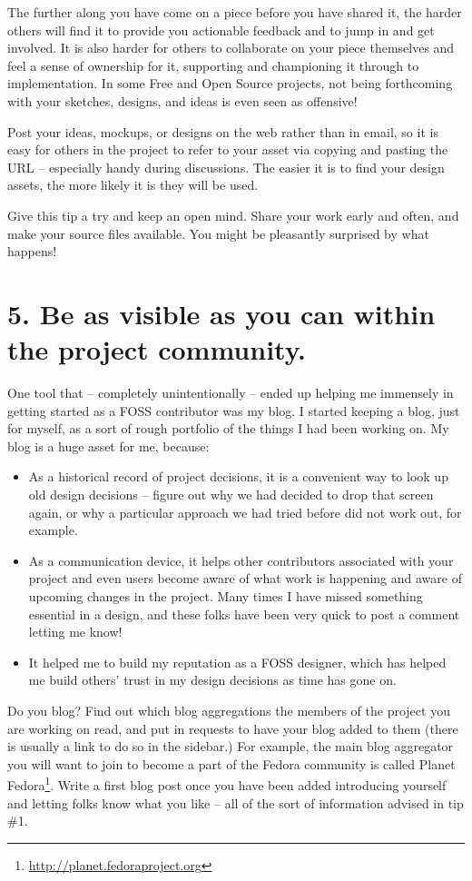The further along you have come on a piece before you have shared it, the harder
others will find it to provide you actionable feedback and to jump in and get
involved. It is also harder for others to collaborate on your piece themselves
and feel a sense of ownership for it, supporting and championing it through to
implementation. In some Free and Open Source projects, not being forthcoming with
your sketches, designs, and ideas is even seen as offensive! 

Post your ideas, mockups, or designs on the web rather than in email, so it is
easy for others in the project to refer to your asset via copying and pasting the
URL -- especially handy during discussions. The easier it is to find your design
assets, the more likely it is they will be used. 

Give this tip a try and keep an open mind. Share your work early and often, and
make your source files available. You might be pleasantly surprised by what
happens!

\section*{5. Be as visible as you can within the project community.}

One tool that -- completely unintentionally -- ended up helping me immensely in
getting started as a FOSS contributor was my blog. I started keeping a
blog, just for myself, as a sort of rough portfolio of the things I had been
working on. My blog is a huge asset for me, because:
\begin{itemize}
 \item As a historical record of project decisions, it is a convenient way to look up old design decisions -- figure out why we had decided to drop that screen again, or why a particular approach we had tried before did not work out, for example.
 \item As a communication device, it helps other contributors associated with your
project and even users become aware of what work is happening and aware of
upcoming changes in the project. Many times I have missed something essential in a design, and these folks have been very quick to post a comment letting me know!
 \item It helped me to build my reputation as a FOSS designer, which has helped me build others' trust in my design decisions as time has gone on. 
\end{itemize}

Do you blog? Find out which blog aggregations the members of the
project you are working on read, and put in requests to have your blog
added to them (there is usually a link to do so in the sidebar.) For example, the main blog aggregator you will want to join to become a part of the Fedora
community is called Planet Fedora\footnote{\url{http://planet.fedoraproject.org}}. Write a first blog
post once you have been added introducing yourself and letting folks know what you like -- all of the sort of information advised in tip \#1.

